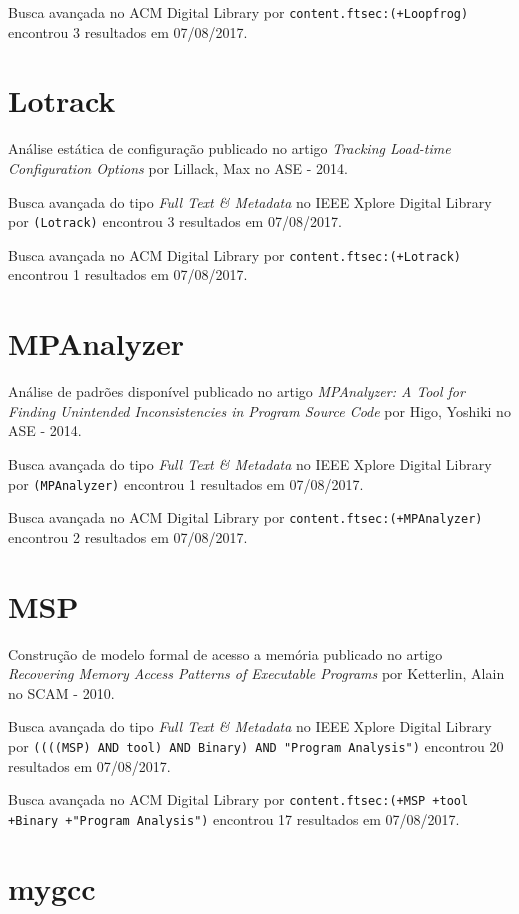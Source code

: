 Busca avançada no ACM Digital Library por
\texttt{content.ftsec:(+Loopfrog)}
encontrou
3 resultados em
07/08/2017.

\section{Lotrack}

Análise estática de configuração
publicado no artigo
{\it Tracking Load-time Configuration Options}
por
Lillack, Max
no
ASE
-
2014.

Busca avançada do tipo {\it Full Text \& Metadata} no IEEE Xplore Digital Library por
\texttt{(Lotrack)}
encontrou
3 resultados em
07/08/2017.

Busca avançada no ACM Digital Library por
\texttt{content.ftsec:(+Lotrack)}
encontrou
1 resultados em
07/08/2017.

\section{MPAnalyzer}

Análise de padrões disponível
publicado no artigo
{\it MPAnalyzer: A Tool for Finding Unintended Inconsistencies in Program Source Code}
por
Higo, Yoshiki
no
ASE
-
2014.

Busca avançada do tipo {\it Full Text \& Metadata} no IEEE Xplore Digital Library por
\texttt{(MPAnalyzer)}
encontrou
1 resultados em
07/08/2017.

Busca avançada no ACM Digital Library por
\texttt{content.ftsec:(+MPAnalyzer)}
encontrou
2 resultados em
07/08/2017.

\section{MSP}

Construção de modelo formal de acesso a memória
publicado no artigo
{\it Recovering Memory Access Patterns of Executable Programs}
por
Ketterlin, Alain
no
SCAM
-
2010.

Busca avançada do tipo {\it Full Text \& Metadata} no IEEE Xplore Digital Library por
\texttt{((((MSP) AND tool) AND Binary) AND "Program Analysis")}
encontrou
20 resultados em
07/08/2017.

Busca avançada no ACM Digital Library por
\texttt{content.ftsec:(+MSP +tool +Binary +"Program Analysis")}
encontrou
17 resultados em
07/08/2017.

\section{mygcc}

